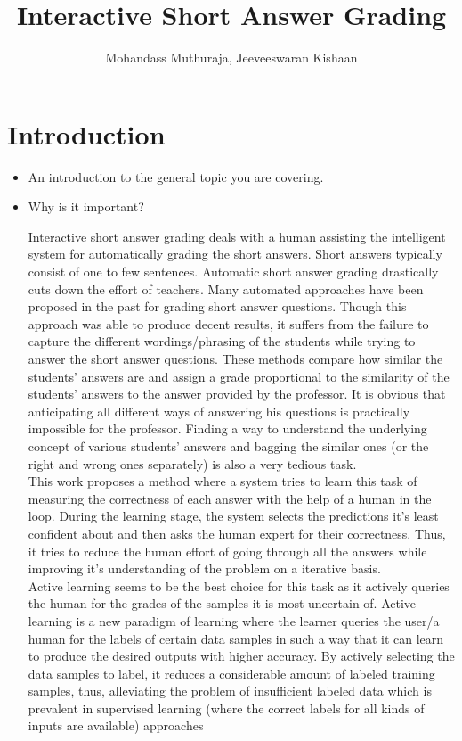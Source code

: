 \documentclass[rnd]{mas_proposal}
\title{Interactive Short Answer Grading}
\author{Mohandass Muthuraja, Jeeveeswaran Kishaan}
\begin{document}
\maketitle

\pagestyle{plain}

\chapter{Introduction}
\begin{itemize}
    \item An introduction to the general topic you are covering.
    \item Why is it important? \\
\vspace*{1\baselineskip}

Interactive short answer grading deals with a human assisting the intelligent system for automatically grading the short answers. Short answers typically consist of one to few sentences. Automatic short answer grading drastically cuts down the effort of teachers. Many automated approaches have been proposed in the past for grading short answer questions. Though this approach was able to produce decent results, it suffers from the failure to capture the different wordings/phrasing of the students while trying to answer the short answer questions. These methods compare how similar the students' answers are and assign a grade proportional to the similarity of the students' answers to the answer provided by the professor. It is obvious that anticipating all different ways of answering his questions is practically impossible for the professor. Finding a way to understand the underlying concept of various students' answers and bagging the similar ones (or the right and wrong ones separately) is also a very tedious task. \\

This work proposes a method where a system tries to learn this task of measuring the correctness of each answer with the help of a human in the loop. During the learning stage, the system selects the predictions it’s least confident about and then asks the human expert for their correctness. Thus, it tries to reduce the human effort of going through all the answers while improving it's understanding of the problem on a iterative basis. \\

Active learning seems to be the best choice for this task as it actively queries the human for the grades of the samples it is most uncertain of.
Active learning is a new paradigm of learning where the learner queries the user/a human for the labels of certain data samples in such a way that it can learn to produce the desired outputs with higher accuracy. By actively selecting the data samples to label, it reduces a considerable amount of labeled training samples, thus, alleviating the problem of insufficient labeled data which is prevalent in supervised learning (where the correct labels for all kinds of inputs are available) approaches  
 

\end{itemize}
\end{document}
